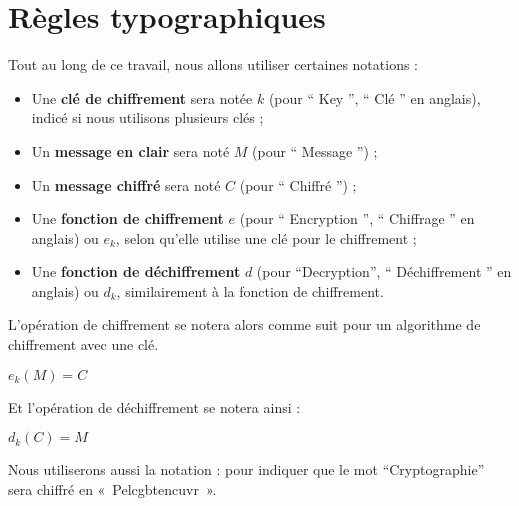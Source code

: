 \section{Règles typographiques}
Tout au long de ce travail, nous allons utiliser certaines notations : 
\begin{itemize}
\item Une \textbf{clé de chiffrement} sera notée $k$ (pour `` Key '',
  `` Clé '' en anglais), indicé si nous utilisons plusieurs clés ;
  \item Un \textbf{message en clair} sera noté $M$ (pour `` Message '') ;
  \item Un \textbf{message chiffré} sera noté $C$ (pour `` Chiffré '') ;
  \item Une \textbf{fonction de chiffrement} $e$ (pour `` Encryption
    '', `` Chiffrage '' en anglais) ou $e_k$, selon qu'elle utilise
    une clé pour le chiffrement ;
  \item Une \textbf{fonction de déchiffrement} $d$ (pour
    ``Decryption'', `` Déchiffrement '' en anglais) ou $d_k$,
    similairement à la fonction de chiffrement.
\end{itemize}
L'opération de chiffrement se notera alors comme suit pour un
algorithme de chiffrement avec une clé.
\begin{center}
  \begin{math}
    e_k(M) = C
  \end{math}
\end{center}
Et l'opération de déchiffrement se notera ainsi :
\begin{center}
  \begin{math}
    d_k(C) = M
  \end{math}
\end{center}
Nous utiliserons aussi la notation : 
pour indiquer que le mot ``Cryptographie'' sera chiffré en
 «~Pelcgbtencuvr~».
  
